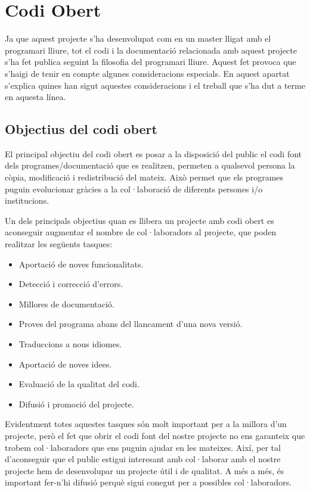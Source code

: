 \chapter{Codi Obert}

Ja que aquest projecte s'ha desenvolupat com en un master lligat amb el programari lliure, tot el codi i la documentació relacionada amb aquest projecte s'ha fet publica seguint la filosofia del programari lliure. Aquest fet provoca que s'haigi de tenir en compte algunes consideracions especials. En aquest apartat s'explica quines han sigut aquestes consideracions i el treball que s'ha dut a terme en aquesta línea. 

\section{Objectius del codi obert}

El principal objectiu del codi obert es posar a la disposició del public el codi font dels programes/documentació que es realitzen, permeten a qualsevol persona la còpia, modificació i redistribució del mateix. Això permet que els programes puguin evolucionar gràcies a la col·laboració de diferents persones i/o institucions.

Un dels principals objectius quan es llibera un projecte amb codi obert es aconseguir augmentar el nombre de col·laboradors al projecte, que poden realitzar les següents tasques:

\begin{itemize}
\item{Aportació de noves funcionalitats.}
\item{Detecció i correcció d'errors.}
\item{Millores de documentació.}
\item{Proves del programa abans del llancament d'una nova versió.}
\item{Traduccions a nous idiomes.}
\item{Aportació de noves idees.}
\item{Evaluació de la qualitat del codi.}
\item{Difusió i promoció del projecte.}
\end{itemize}

Evidentment totes aquestes tasques són molt important per a la millora d'un projecte, però el fet que obrir el codi font del nostre projecte no ens garanteix que trobem col·laboradors que ens puguin ajudar en les mateixes. Així, per tal d'aconseguir que el public estigui interesant amb col·laborar amb el nostre projecte hem de desenvolupar un projecte útil i de qualitat. A més a més, és important fer-n'hi difusió perquè sigui conegut per a possibles col·laboradors.  


